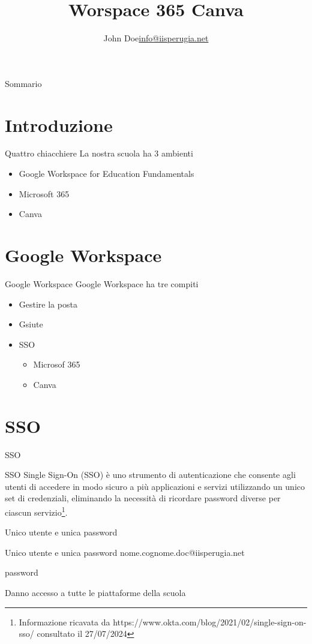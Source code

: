\documentclass{beamer}
\title{Worspace 365 Canva}
\author{\texorpdfstring{John Doe\newline\url{info@iisperugia.net}}{John Doe}}
\begin{document}
\begin{frame}%
    \maketitle
 \end{frame}
\begin{frame}{Sommario}
	\tableofcontents
\end{frame}
\section{Introduzione}
\begin{frame}{Quattro chiacchiere}
	La nostra scuola ha 3 ambienti 
	\begin{itemize}[(I)]
		\item<1-> Google Workspace for Education Fundamentals
		\item<2-> Microsoft 365
		\item<3-> Canva
	\end{itemize}
\end{frame}
\section{Google Workspace}
\begin{frame}{Google Workspace}
 Google Workspace ha tre compiti
	\begin{itemize}[(I)]
		\item<1-> Gestire la posta
		\item<2-> Gsiute 
		\item<3-> SSO
		\begin{itemize}
			\item<4->Microsof 365
			\item<5->Canva
		\end{itemize}
	\end{itemize}
\end{frame}
\section{SSO}
\begin{frame}{SSO}
	\begin{alertblock}{SSO}
	Single Sign-On (SSO) è uno strumento di autenticazione che consente agli utenti di accedere in modo sicuro a più applicazioni e servizi utilizzando un unico set di credenziali, eliminando la necessità di ricordare password diverse per ciascun servizio\footnote{Informazione ricavata da https://www.okta.com/blog/2021/02/single-sign-on-sso/ consultato il 27/07/2024}.
	\end{alertblock}
\end{frame}
\begin{frame}{Unico utente e unica password}
	\begin{alertblock}{Unico utente e unica password}
	nome.cognome.doc@iisperugia.net
	
	password 
	
Danno accesso a tutte le piattaforme della scuola
	\end{alertblock}
\end{frame}
\end{document}
